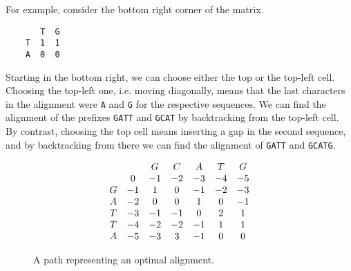 For example, consider the bottom right corner of the matrix.

\begin{verbatim}
       T  G
    T  1  1
    A  0  0
\end{verbatim}

Starting in the bottom right, we can choose either the top or the top-left cell. Choosing the top-left one, i.e. moving diagonally, means that
the last characters in the alignment were \verb|A| and \verb|G| for the respective sequences. We can find the alignment of the prefixes \verb|GATT|
and \verb|GCAT| by backtracking from the top-left cell. By contrast, choosing the top cell means inserting a gap in the second sequence, and by backtracking
from there we can find the alignment of \verb|GATT| and \verb|GCATG|.

\begin{figure}[h]
    \begin{equation*}
        \begin{matrix}
                &            & G          & C          & A          & T          & G        \\
                & \rn{00}{0} & -1         & -2         & -3         & -4         & -5       \\
            G   & -1         & \rn{11}{1} & 0          & -1         & -2         & -3       \\
            A   & -2         & 0          & \rn{22}{0} & \rn{23}{1} & 0          & -1       \\
            T   & -3         & -1         & -1         & 0          & \rn{34}{2} & 1        \\
            T   & -4         & -2         & -2         & -1         & \rn{44}{1} & 1        \\
            A   & -5         & -3         & 3          & -1         & 0          & \rn{55}{0}
        \end{matrix}
    \end{equation*}

\caption{A path representing an optimal alignment.}
\label{alignment_path}
\end{figure}


